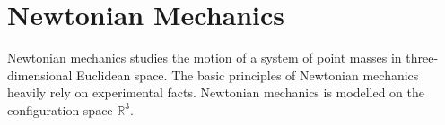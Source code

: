 \section*{Newtonian Mechanics}
Newtonian mechanics studies the motion of a system of point masses in three-dimensional Euclidean space. The basic principles of Newtonian mechanics heavily rely on experimental facts. Newtonian mechanics is modelled on the configuration space $\mathbb{R}^3$.

\begin{axiom}
		
\end{axiom}

